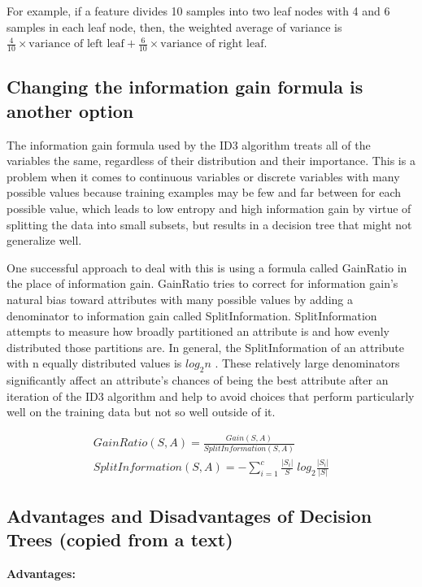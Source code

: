 \documentclass[12pt]{report}
\begin{document}
For example, if a feature divides 10 samples into two leaf nodes with 4 and 6 samples in each leaf node, then, the weighted average of variance is $\frac{4}{10} \times \text{variance of left leaf} + \frac{6}{10} \times \text{variance of right leaf} $.

\subsection{Changing the information gain formula is another option}
The information gain formula used by the ID3 algorithm treats all of the variables the same, regardless of their distribution and their importance. This is a problem when it comes to continuous variables or discrete variables with many possible values because training examples may be few and far between for each possible value, which leads to low entropy and high information gain by virtue of splitting the data into small subsets, but results in a decision tree that might not generalize well.

One successful approach to deal with this is using a formula called GainRatio in the place of information gain. GainRatio tries to correct for information gain’s natural bias toward attributes with many possible values by adding a denominator to information gain called SplitInformation. SplitInformation attempts to measure how broadly partitioned an attribute is and how evenly distributed those partitions are. In general, the SplitInformation of an attribute with n equally ­distributed values is $log_2 n$ . These relatively large denominators significantly affect an attribute’s chances of being the best attribute after an iteration of the ID3 algorithm and help to avoid choices that perform particularly well on the training data but not so well outside of it.

\begin{gather*}
	GainRatio(S,A)  = \frac{Gain(S,A)}{SplitInformation(S,A)} \\
	SplitInformation(S,A) = - \sum_{i=1}^c \frac{|S_i|}{S} \; log_2\frac{|S_i|}{|S|}
\end{gather*}


\subsection{Advantages and Disadvantages of Decision Trees (copied from a text)}
\textbf{Advantages:}
\end{document}
